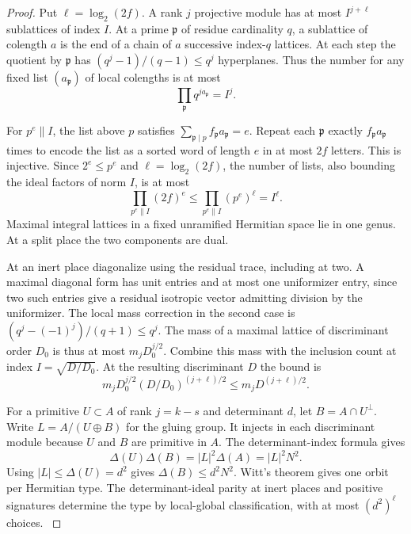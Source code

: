 \begin{proof}
Put \(\ell=\log_2(2f)\). A rank \(j\) projective module
has at most \(I^{j+\ell}\) sublattices of index \(I\).
At a prime \(\mathfrak p\) of residue cardinality \(q\), a
sublattice of colength \(a\) is the end of a chain of \(a\)
successive index-\(q\) lattices. At each step the quotient by
\(\mathfrak p\) has \( (q^j-1)/(q-1)\le q^j\) hyperplanes.
Thus the number for any fixed list \((a_{\mathfrak p})\)
of local colengths is at most
\[
  \prod_{\mathfrak p}q^{j a_{\mathfrak p}}=I^j .
\]

For \(p^e\parallel I\), the list above \(p\) satisfies
\(\sum_{\mathfrak p\mid p}f_{\mathfrak p}a_{\mathfrak p}=e\).
Repeat each \(\mathfrak p\) exactly
\(f_{\mathfrak p}a_{\mathfrak p}\) times to encode the list as a
sorted word of length \(e\) in at most \(2f\) letters. This
is injective. Since \(2^e\le p^e\) and \(\ell=\log_2(2f)\),
the number of lists, also bounding the ideal factors of norm \(I\),
is at most
\[
  \prod_{p^e\parallel I}(2f)^e\le
  \prod_{p^e\parallel I}(p^e)^\ell=I^\ell .
\] Maximal integral lattices in a fixed unramified
Hermitian space lie in one genus. At a split place the
two components are dual.

At an inert place diagonalize
using the residual trace, including at two. A maximal
diagonal form has unit entries and at most one uniformizer
entry, since two such entries give a residual isotropic
vector admitting division by the uniformizer. The local
mass correction in the second case is
\((q^j-(-1)^j)/(q+1)\leq q^j\). \cite{gan-hanke-yu}
The mass of a maximal lattice of discriminant order \(D_0\)
is thus at most \(m_jD_0^{j/2}\).
Combine this mass with the inclusion count at index
\(I=\sqrt{D/D_0}\). At the resulting discriminant \(D\) the bound is
\[
     m_jD_0^{j/2}(D/D_0)^{(j+\ell)/2}
         \le m_jD^{(j+\ell)/2}.
\]


For a primitive \(U\subset A\) of rank \(j=k-s\) and
determinant \(d\), let \(B=A\cap U^\perp\). Write \(L=A/(U\oplus B)\) for the gluing group.
It injects in each discriminant module because \(U\) and \(B\)
are primitive in \(A\). The determinant-index formula gives
\[
 \Delta(U)\Delta(B)=|L|^2\Delta(A)=|L|^2N^2 .
\]
Using \(|L|\le\Delta(U)=d^2\) gives
\(\Delta(B)\le d^2N^2\). Witt's theorem gives one orbit per Hermitian type. The determinant-ideal parity at inert places and
positive signatures determine the type by local-global
classification, with at most \((d^2)^\ell\) choices.
\cite{landherr}



\end{proof}
